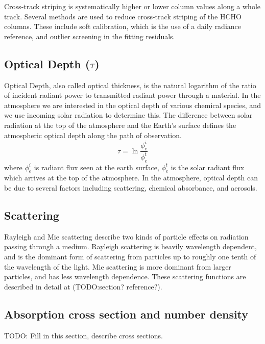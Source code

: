     Cross-track striping is systematically higher or lower column values along a whole track.
    Several methods are used to reduce cross-track striping of the HCHO columns.
    These include soft calibration, which is the use of a daily radiance reference, and outlier screening in the fitting residuals.
    
  \subsection{Optical Depth (\texorpdfstring{$\tau$)}{t}}
    \label{ch_isop:sec:satelliteHCHO:OpticalDepth}
    
    Optical Depth, also called optical thickness, is the natural logarithm of the ratio of incident radiant power to transmitted radiant power through a material.
    In the atmosphere we are interested in the optical depth of various chemical species, and we use incoming solar radiation to determine this. The difference between solar radiation at the top of the atmosphere and the Earth's surface defines the atmospheric optical depth along the path of observation.
    \begin{equation*}
      \tau = \ln{\frac{\phi_e^i}{\phi_e^t}}
    \end{equation*}
    where $\phi_e^i$ is radiant flux seen at the earth surface, $\phi_e^t$ is the solar radiant flux which arrives at the top of the atmosphere.
    In the atmosphere, optical depth can be due to several factors including scattering, chemical absorbance, and aerosols.
  
  \subsection{Scattering}
    \label{ch_isop:sec:satelliteHCHO:scattering}
    Rayleigh and Mie scattering describe two kinds of particle effects on radiation passing through a medium. Rayleigh scattering is heavily wavelength dependent, and is the dominant form of scattering from particles up to roughly one tenth of the wavelength of the light. Mie scattering is more dominant from larger particles, and has less wavelength dependence. These scattering functions are described in detail at (TODO:section? reference?).
    
  \subsection{Absorption cross section and number density}
    \label{ch_isop:sec:satelliteHCHO:crosssection}
    TODO: Fill in this section, describe cross sections.
    
